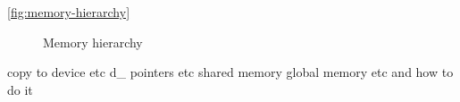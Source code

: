 
\autoref{fig:memory-hierarchy}

\begin{figure}[ht]
	\centering
	\caption{Memory hierarchy}
	\label{fig:memory-hierarchy}
\end{figure}


copy to device etc
d\_ pointers etc
shared memory
global memory etc and how to do it

